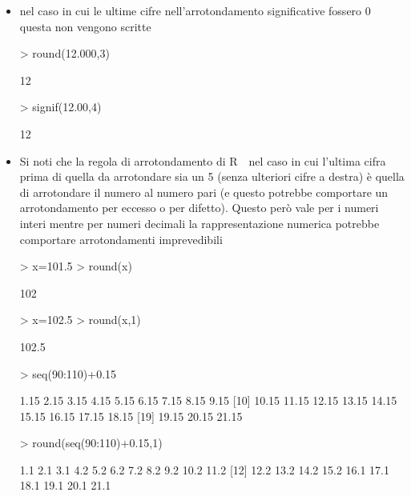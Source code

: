 \documentclass[onecolumn,11pt]{book}
\newcommand{\rpr}{\textsf{R}~}
\begin{document}
\begin{itemize}
\item nel caso in cui le ultime cifre nell'arrotondamento  significative fossero 0 questa non vengono scritte
\begin{Schunk}
\begin{Sinput}
> round(12.000,3)
\end{Sinput}
\begin{Soutput}
[1] 12
\end{Soutput}
\begin{Sinput}
> signif(12.00,4)
\end{Sinput}
\begin{Soutput}
[1] 12
\end{Soutput}
\end{Schunk}
\item
Si noti che la regola di arrotondamento di \rpr\ nel caso in cui l'ultima cifra prima di quella da arrotondare sia un 5 (senza ulteriori cifre a destra) \`e quella di arrotondare il numero al numero pari  (e questo potrebbe comportare un arrotondamento per eccesso o per difetto). Questo per\`o vale per i numeri interi mentre per numeri decimali la rappresentazione numerica potrebbe comportare arrotondamenti imprevedibili
\begin{Schunk}
\begin{Sinput}
> x=101.5
> round(x)
\end{Sinput}
\begin{Soutput}
[1] 102
\end{Soutput}
\begin{Sinput}
> x=102.5
> round(x,1)
\end{Sinput}
\begin{Soutput}
[1] 102.5
\end{Soutput}
\begin{Sinput}
> seq(90:110)+0.15
\end{Sinput}
\begin{Soutput}
 [1]  1.15  2.15  3.15  4.15  5.15  6.15  7.15  8.15  9.15
[10] 10.15 11.15 12.15 13.15 14.15 15.15 16.15 17.15 18.15
[19] 19.15 20.15 21.15
\end{Soutput}
\begin{Sinput}
> round(seq(90:110)+0.15,1)
\end{Sinput}
\begin{Soutput}
 [1]  1.1  2.1  3.1  4.2  5.2  6.2  7.2  8.2  9.2 10.2 11.2
[12] 12.2 13.2 14.2 15.2 16.1 17.1 18.1 19.1 20.1 21.1
\end{Soutput}
\end{Schunk}

\end{itemize}
\end{document}
